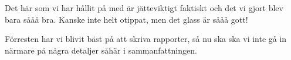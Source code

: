 Det här som vi har hållit på med är jätteviktigt faktiskt och det vi gjort blev bara sååå bra.  Kanske inte helt otippat, men det glass är sååå gott!

Förresten har vi blivit bäst på att skriva rapporter, så nu ska ska vi inte gå in närmare på några detaljer såhär i sammanfattningen.
